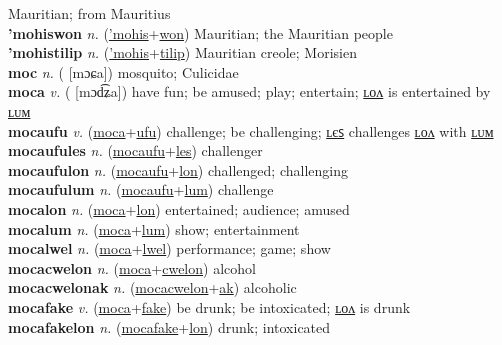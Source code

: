 Mauritian; from Mauritius \label{'mohisak} \\
\textbf{'mohiswon} \textit{n.} (\hyperref['mohis]{'mohis}+\hyperref[won]{won})
Mauritian; the Mauritian people \label{'mohiswon} \\
\textbf{'mohistilip} \textit{n.} (\hyperref['mohis]{'mohis}+\hyperref[tilip]{tilip})
Mauritian creole; Morisien \label{'mohistilip} \\
\textbf{moc} \textit{n.} ( [mɔɕa])
mosquito; Culicidae \label{moc} \\
\textbf{moca} \textit{v.} ( [mɔd͡ʑa])
have fun; be amused; play; entertain; \hyperref[mocalon]{ʟᴏᴧ} is entertained by \hyperref[mocalum]{ʟᴜᴍ} \label{moca} \\
\textbf{mocaufu} \textit{v.} (\hyperref[moca]{moca}+\hyperref[ufu]{ufu})
challenge; be challenging; \hyperref[mocaufules]{ʟєꜱ} challenges \hyperref[mocaufulon]{ʟᴏᴧ} with \hyperref[mocaufulum]{ʟᴜᴍ} \label{mocaufu} \\
\textbf{mocaufules} \textit{n.} (\hyperref[mocaufu]{mocaufu}+\hyperref[les]{les})
challenger \label{mocaufules} \\
\textbf{mocaufulon} \textit{n.} (\hyperref[mocaufu]{mocaufu}+\hyperref[lon]{lon})
challenged; challenging \label{mocaufulon} \\
\textbf{mocaufulum} \textit{n.} (\hyperref[mocaufu]{mocaufu}+\hyperref[lum]{lum})
challenge \label{mocaufulum} \\
\textbf{mocalon} \textit{n.} (\hyperref[moca]{moca}+\hyperref[lon]{lon})
entertained; audience; amused \label{mocalon} \\
\textbf{mocalum} \textit{n.} (\hyperref[moca]{moca}+\hyperref[lum]{lum})
show; entertainment \label{mocalum} \\
\textbf{mocalwel} \textit{n.} (\hyperref[moca]{moca}+\hyperref[lwel]{lwel})
performance; game; show \label{mocalwel} \\
\textbf{mocacwelon} \textit{n.} (\hyperref[moca]{moca}+\hyperref[cwelon]{cwelon})
alcohol \label{mocacwelon} \\
\textbf{mocacwelonak} \textit{n.} (\hyperref[mocacwelon]{mocacwelon}+\hyperref[ak]{ak})
alcoholic \label{mocacwelonak} \\
\textbf{mocafake} \textit{v.} (\hyperref[moca]{moca}+\hyperref[fake]{fake})
be drunk; be intoxicated; \hyperref[mocafakelon]{ʟᴏᴧ} is drunk \label{mocafake} \\
\textbf{mocafakelon} \textit{n.} (\hyperref[mocafake]{mocafake}+\hyperref[lon]{lon})
drunk; intoxicated \label{mocafakelon} \\
